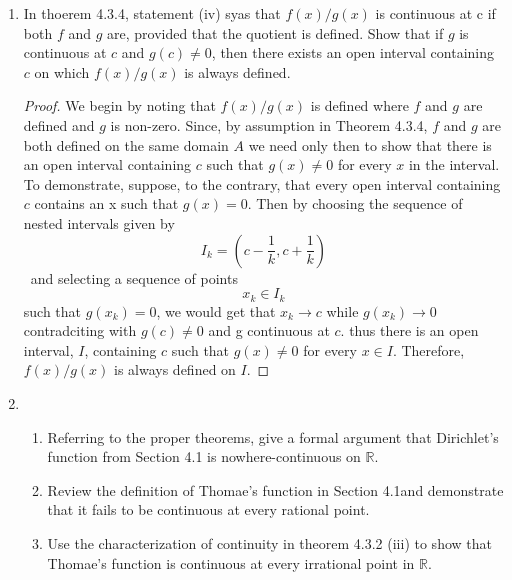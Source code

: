 \begin{enumerate}
    \item In thoerem 4.3.4, statement (iv) syas that \( f(x)/g(x) \) is continuous at c if both \( f \) and \( g \) are, provided that the quotient is defined. Show that if \( g \) is continuous at \( c \) and \( g(c) \neq 0 \), then there exists an open interval containing \( c \) on which \( f(x)/g(x) \) is always defined.
    
    \begin{proof}
    We begin by noting that \( f(x)/g(x) \) is defined where \( f \) and \( g \) are defined and \( g \) is non-zero. Since, by assumption in Theorem 4.3.4, \( f \) and \( g \) are both defined on the same domain \( A \) we need only then to show that there is an open interval containing \( c \) such that \( g(x) \neq 0 \) for every \( x \) in the interval. To demonstrate, suppose, to the contrary, that every open interval containing \( c \) contains an x such that \( g(x) = 0 \). Then by choosing the sequence of nested intervals given by
    \[
    I_{k} = (c-\frac{1}{k},c+\frac{1}{k})
    \]\
    and selecting a sequence of points
    \[
    x_{k} \in I_{k}
    \]
    such that \( g(x_{k})=0 \), we would get that \( x_{k} \rightarrow c \) while \( g(x_{k}) \rightarrow 0 \) contradciting with \( g(c) \neq 0 \) and g continuous at \( c \). thus there is an open interval, \( I \), containing \( c \) such that \( g(x) \neq 0 \) for every \( x \in I \). Therefore, \( f(x)/g(x) \) is always defined on \( I \).
    \end{proof}
    
    \item \begin{enumerate}
        \item Referring to the proper theorems, give a formal argument that Dirichlet's function from Section 4.1 is nowhere-continuous on \( \mathbb{R} \).
        
        \item Review the definition of Thomae's function in Section 4.1and demonstrate that it fails to be continuous at every rational point.
        
        \item Use the characterization of continuity in theorem 4.3.2 (iii) to show that Thomae's function is continuous at every irrational point in \( \mathbb{R} \). 
    \end{enumerate}
    

\end{enumerate}
